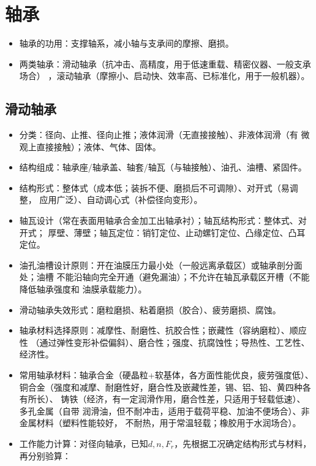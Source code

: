 \documentclass[12pt,a4paper]{article}
\newcommand{\tightlist}{\setlength{\parskip}{0pt}\setlength{\itemsep}{0pt}}
\newcommand{\hint}[1]{\textsf{（#1）}}
\begin{document}
\section{轴承}
\begin{itemize}\tightlist
    \item 轴承的功用：支撑轴系，减小轴与支承间的摩擦、磨损。
    \item 两类轴承：滑动轴承\hint{抗冲击、高精度，用于低速重载、精密仪器、一般支承场合}
    ，滚动轴承\hint{摩擦小、启动快、效率高、已标准化，用于一般机器}。
\end{itemize}

\subsection{滑动轴承}
\begin{itemize}\tightlist
    \item 分类：径向、止推、径向止推；液体润滑\hint{无直接接触}、非液体润滑\hint{有
    微观上直接接触}；液体、气体、固体。
    \item 结构组成：轴承座/轴承盖、轴套/轴瓦\hint{与轴接触}、油孔、油槽、紧固件。
    \item 结构形式：整体式\hint{成本低；装拆不便、磨损后不可调隙}、对开式\hint{易调整，
    应用广泛}、自动调心式\hint{补偿径向变形}。
    \item 轴瓦设计\hint{常在表面用轴承合金加工出轴承衬}；轴瓦结构形式：整体式、对开式；
    厚壁、薄壁；轴瓦定位：销钉定位、止动螺钉定位、凸缘定位、凸耳定位。
    \item 油孔油槽设计原则：开在油膜压力最小处\hint{一般远离承载区}或轴承剖分面处；油槽
    不能沿轴向完全开通\hint{避免漏油}；不允许在轴瓦承载区开槽\hint{不能降低轴承强度和
    油膜承载能力}。
    \item 滑动轴承失效形式：磨粒磨损、粘着磨损\hint{胶合}、疲劳磨损、腐蚀。
    \item 轴承材料选择原则：减摩性、耐磨性、抗胶合性；嵌藏性\hint{容纳磨粒}、顺应性
    \hint{通过弹性变形补偿偏斜}、磨合性；强度、抗腐蚀性；导热性、工艺性、经济性。
    \item 常用轴承材料：轴承合金\hint{硬晶粒+软基体，各方面性能优良，疲劳强度低}、
    铜合金\hint{强度和减摩、耐磨性好，磨合性及嵌藏性差，锡、铝、铅、黄四种各有所长}、
    铸铁\hint{经济，有一定润滑作用，磨合性差，只适用于轻载低速}、多孔金属\hint{自带
    润滑油，但不耐冲击，适用于载荷平稳、加油不便场合}、非金属材料\hint{塑料性能较好，
    不耐热，用于常温轻载；橡胶用于水润场合}。
    \item 工作能力计算：对径向轴承，已知$d,n,F_r$，先根据工况确定结构形式与材料，再分别验算：

\end{itemize}
\end{document}
